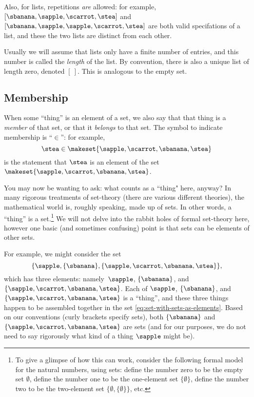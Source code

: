 Also, for lists, repetitions \emph{are} allowed: for example, $[\sbanana, \sapple, \scarrot, \stea]$ and $[\sbanana, \sapple, \sapple, \scarrot, \stea]$ are both valid specifations of a list, and these the two lists are distinct from each other.

Usually we will assume that lists only have a finite number of entries, and this number is called the \emph{length} of the list. By convention, there is also a unique list of length zero, denoted $[ \ ]$. This is analogous to the empty set. 


\subsection{Membership}

When some ``thing'' is an element of a set, we also say that that thing is a \emph{member} of that set, or that it \emph{belongs} to that set.
The symbol to indicate membership is ``$\in$'': for example,
\begin{equation}
    \stea \in \makeset{ \sapple, \scarrot, \sbanana, \stea }
\end{equation}
is the statement that $\stea$ is an element of the set~$\makeset{ \sapple, \scarrot, \sbanana, \stea }$.


You may now be wanting to ask: what counts as a ``thing" here, anyway? In many rigorous treatments of set-theory (there are various different theories), the mathematical world is, roughly speaking, made up of sets.
In other words, a ``thing'' is a set.\footnote{To give a glimpse of how this can work, consider the following formal model for the natural numbers, using sets: define the number zero to be the empty set $\emptyset$, define the number one to be the one-element set $\{ \emptyset \}$, define the number two to be the two-element set $\{ \emptyset, \{ \emptyset \} \}$, etc. } 
We will not delve into the rabbit holes of formal set-theory here, however one basic (and sometimes confusing) point is that sets can be elements of other sets.

For example, we might consider the set
%
\begin{equation}\label{eq:set-with-sets-as-elements}
    \{ \sapple, \{ \sbanana \}, \{ \sapple, \scarrot, \sbanana, \stea \} \},
\end{equation}
%
which has three elements: namely~$\sapple$, $\{ \sbanana \}$, and~$\{ \sapple, \scarrot, \sbanana, \stea \}$.
Each of $\sapple$, $\{ \sbanana \}$, and~$\{ \sapple, \scarrot, \sbanana, \stea \}$ is a ``thing'', and these three things happen to be assembled together in the set \cref{eq:set-with-sets-as-elements}.
Based on our conventions (curly brackets specify sets), both $\{ \sbanana \}$ and~$\{ \sapple, \scarrot, \sbanana, \stea \}$ are sets (and for our purposes, we do not need to say rigorously what kind of a thing $\sapple$ might be).


